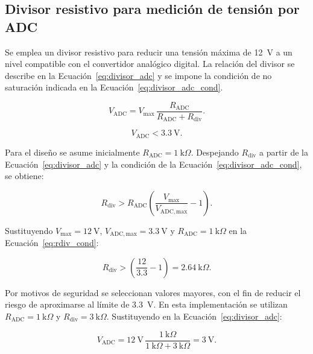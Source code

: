 \subsection{Divisor resistivo para medición de tensión por ADC}
\label{subsec:divisor_adc}

Se emplea un divisor resistivo para reducir una tensión máxima de 12~V a un nivel compatible con el convertidor analógico digital. La relación del divisor se describe en la Ecuación~\ref{eq:divisor_adc} y se impone la condición de no saturación indicada en la Ecuación~\ref{eq:divisor_adc_cond}.

\begin{equation}
V_{\mathrm{ADC}} = V_{\max}\,\frac{R_{\mathrm{ADC}}}{R_{\mathrm{ADC}} + R_{\mathrm{div}}}.
\label{eq:divisor_adc}
\end{equation}

\begin{equation}
V_{\mathrm{ADC}} < 3.3~\mathrm{V}.
\label{eq:divisor_adc_cond}
\end{equation}

Para el diseño se asume inicialmente \(R_{\mathrm{ADC}}=1~\mathrm{k}\Omega\). Despejando \(R_{\mathrm{div}}\) a partir de la Ecuación~\ref{eq:divisor_adc} y la condición de la Ecuación~\ref{eq:divisor_adc_cond}, se obtiene:

\begin{equation}
R_{\mathrm{div}} > R_{\mathrm{ADC}}\left(\frac{V_{\max}}{V_{\mathrm{ADC,max}}}-1\right).
\label{eq:rdiv_cond}
\end{equation}

Sustituyendo \(V_{\max}=12~\mathrm{V}\), \(V_{\mathrm{ADC,max}}=3.3~\mathrm{V}\) y \(R_{\mathrm{ADC}}=1~\mathrm{k}\Omega\) en la Ecuación~\ref{eq:rdiv_cond}:

\begin{equation}
R_{\mathrm{div}} > \left(\frac{12}{3.3}-1\right) = 2.64~\mathrm{k}\Omega.
\label{eq:rdiv_num}
\end{equation}

Por motivos de seguridad se seleccionan valores mayores, con el fin de reducir el riesgo de aproximarse al límite de 3.3~V. En esta implementación se utilizan \(R_{\mathrm{ADC}}=1~\mathrm{k}\Omega\) y \(R_{\mathrm{div}}=3~\mathrm{k}\Omega\). Sustituyendo en la Ecuación~\ref{eq:divisor_adc}:

\begin{equation}
V_{\mathrm{ADC}} = 12~\mathrm{V}\,\frac{1~\mathrm{k}\Omega}{1~\mathrm{k}\Omega+3~\mathrm{k}\Omega}
= 3~\mathrm{V}.
\label{eq:vadc_num}
\end{equation}

